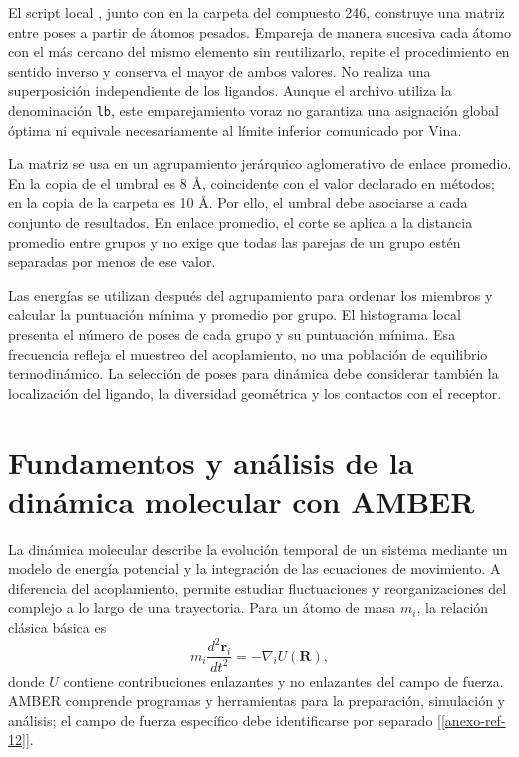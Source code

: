 \documentclass[12 pt, letter, oneside]{book}
\begin{document}
El script local , junto con  en la carpeta del compuesto 246, construye una matriz entre poses a partir de átomos pesados. Empareja de manera sucesiva cada átomo con el más cercano del mismo elemento sin reutilizarlo, repite el procedimiento en sentido inverso y conserva el mayor de ambos valores. No realiza una superposición independiente de los ligandos. Aunque el archivo utiliza la denominación \texttt{lb}, este emparejamiento voraz no garantiza una asignación global óptima ni equivale necesariamente al límite inferior comunicado por Vina.

La matriz se usa en un agrupamiento jerárquico aglomerativo de enlace promedio. En la copia de  el umbral es 8 Å, coincidente con el valor declarado en métodos; en la copia de la carpeta  es 10 Å. Por ello, el umbral debe asociarse a cada conjunto de resultados. En enlace promedio, el corte se aplica a la distancia promedio entre grupos y no exige que todas las parejas de un grupo estén separadas por menos de ese valor.

Las energías se utilizan después del agrupamiento para ordenar los miembros y calcular la puntuación mínima y promedio por grupo. El histograma local presenta el número de poses de cada grupo y su puntuación mínima. Esa frecuencia refleja el muestreo del acoplamiento, no una población de equilibrio termodinámico. La selección de poses para dinámica debe considerar también la localización del ligando, la diversidad geométrica y los contactos con el receptor.

\chapter{Fundamentos y análisis de la dinámica molecular con AMBER}
\label{ap:dinamica-amber}

La dinámica molecular describe la evolución temporal de un sistema mediante un modelo de energía potencial y la integración de las ecuaciones de movimiento. A diferencia del acoplamiento, permite estudiar fluctuaciones y reorganizaciones del complejo a lo largo de una trayectoria. Para un átomo de masa $m_i$, la relación clásica básica es
\begin{equation}
 m_i\frac{d^2\mathbf r_i}{dt^2}=-\nabla_i U(\mathbf R),
\end{equation}
donde $U$ contiene contribuciones enlazantes y no enlazantes del campo de fuerza. AMBER comprende programas y herramientas para la preparación, simulación y análisis; el campo de fuerza específico debe identificarse por separado [\ref{anexo-ref-12}].
\end{document}
